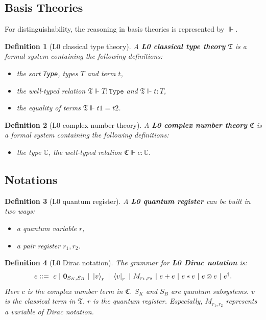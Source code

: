 \documentclass{article}
\newtheorem{dfn}{Definition}
\begin{document}
\subsection{Basis Theories}
For distinguishability, the reasoning in basis theories is represented by $\Vdash$.

\begin{dfn}[L0 classical type theory]
  A \textbf{L0 classical type theory} $\mathfrak{T}$ is a formal system containing the following definitions:
  \begin{itemize}
    \item the sort \texttt{Type}, types $T$ and term $t$,
    \item the well-typed relation $\mathfrak{T} \Vdash T : \texttt{Type}$ and $\mathfrak{T} \Vdash t : T$,
    \item the equality of terms $\mathfrak{T} \Vdash t1 = t2$.
  \end{itemize}
\end{dfn}

\begin{dfn}[L0 complex number theory]
  A \textbf{L0 complex number theory} $\mathfrak{C}$ is a formal system containing the following definitions:
  \begin{itemize}
    \item the type $\mathbb{C}$, the well-typed relation $\mathfrak{C} \Vdash c : \mathbb{C}$.
  \end{itemize}
\end{dfn}

\subsection{Notations}

\begin{dfn}[L0 quantum register]
  A \textbf{L0 quantum register} can be built in two ways:
  \begin{itemize}
    \item a quantum variable $r$,
    \item a pair register $r_1, r_2$.
  \end{itemize}
\end{dfn}

\begin{dfn}[L0 Dirac notation]
  The grammar for \textbf{L0 Dirac notation} is:
  $$
  e ::=\ c\ |\ \textbf{0}_{S_K, S_B}\ |\ \ket{v}_r\ |\ \bra{v}_r\ |\ M_{r_1, r_2}\ |\ e + e\ |\ e * e\ |\ e \otimes e\ |\ e^\dagger.
  $$
  Here $c$ is the complex number term in $\mathfrak{C}$. $S_K$ and $S_B$ are quantum subsystems. $v$ is the classical term in $\mathfrak{T}$. $r$ is the quantum register. Especially, $M_{r_1, r_2}$ represents a variable of Dirac notation.
\end{dfn}
\end{document}
